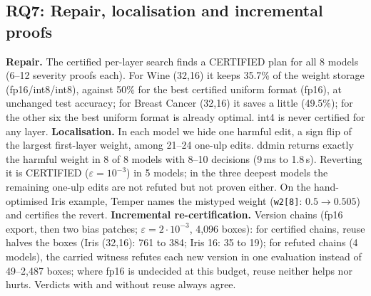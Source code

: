 \documentclass[conference]{IEEEtran}
\begin{document}
\subsection{RQ7: Repair, localisation and incremental proofs}
\textbf{Repair.} The certified per-layer search finds a CERTIFIED plan for all 8 models (6--12 severity proofs each). For Wine (32,16) it keeps 35.7\% of the weight storage (fp16/int8/int8), against 50\% for the best certified uniform format (fp16), at unchanged test accuracy; for Breast Cancer (32,16) it saves a little (49.5\%); for the other six the best uniform format is already optimal. int4 is never certified for any layer.
\textbf{Localisation.} In each model we hide one harmful edit, a sign flip of the largest first-layer weight, among 21--24 one-ulp edits. ddmin returns exactly the harmful weight in 8 of 8 models with 8--10 decisions (9\,ms to 1.8\,s). Reverting it is CERTIFIED ($\varepsilon=10^{-3}$) in 5 models; in the three deepest models the remaining one-ulp edits are not refuted but not proven either. On the hand-optimised Iris example, Temper names the mistyped weight (\texttt{w2[8]}: $0.5\to0.505$) and certifies the revert.
\textbf{Incremental re-certification.} Version chains (fp16 export, then two bias patches; $\varepsilon=2\cdot10^{-3}$, 4{,}096 boxes): for certified chains, reuse halves the boxes (Iris (32,16): 761 to 384; Iris 16: 35 to 19); for refuted chains (4 models), the carried witness refutes each new version in one evaluation instead of 49--2{,}487 boxes; where fp16 is undecided at this budget, reuse neither helps nor hurts. Verdicts with and without reuse always agree.
\end{document}
